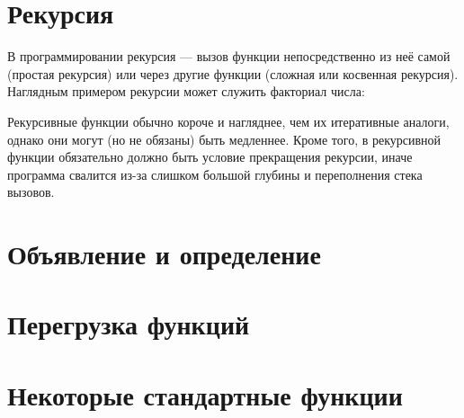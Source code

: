\documentclass[book.tex]{subfiles}
\begin{document}

\section*{Рекурсия}


В программировании рекурсия --- вызов функции непосредственно из неё самой (простая рекурсия) или через другие функции (сложная или косвенная рекурсия). Наглядным примером рекурсии может служить факториал числа:


Рекурсивные функции обычно короче и нагляднее, чем их итеративные аналоги, однако они могут (но не обязаны) быть медленнее. Кроме того, в рекурсивной функции обязательно должно быть условие прекращения рекурсии, иначе программа свалится из-за слишком большой глубины и переполнения стека вызовов.

\section*{Объявление и определение}


\section*{Перегрузка функций}

\section*{Некоторые стандартные функции}
\end{document}
